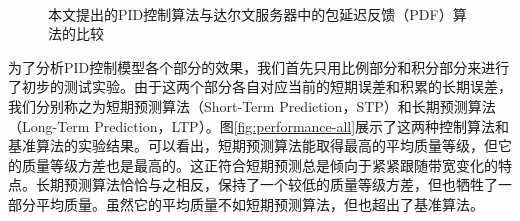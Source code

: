 \begin{figure}[!ht]
	\centering
	\vspace{10pt}
	\vspace{10pt}
	\vspace{10pt}
	 \\
	\vspace{10pt}
	\vspace{10pt}
	\vspace{10pt}
	\caption{本文提出的PID控制算法与达尔文服务器中的包延迟反馈（PDF）算法的比较}
	\label{fig:performance-two}
	\vspace{10pt}
\end{figure}

为了分析PID控制模型各个部分的效果，我们首先只用比例部分和积分部分来进行了初步的测试实验。由于这两个部分各自对应当前的短期误差和积累的长期误差，我们分别称之为短期预测算法（Short-Term Prediction，STP）和长期预测算法（Long-Term Prediction，LTP）。图\ref{fig:performance-all}展示了这两种控制算法和基准算法的实验结果。可以看出，短期预测算法能取得最高的平均质量等级，但它的质量等级方差也是最高的。这正符合短期预测总是倾向于紧紧跟随带宽变化的特点。长期预测算法恰恰与之相反，保持了一个较低的质量等级方差，但也牺牲了一部分平均质量。虽然它的平均质量不如短期预测算法，但也超出了基准算法。

